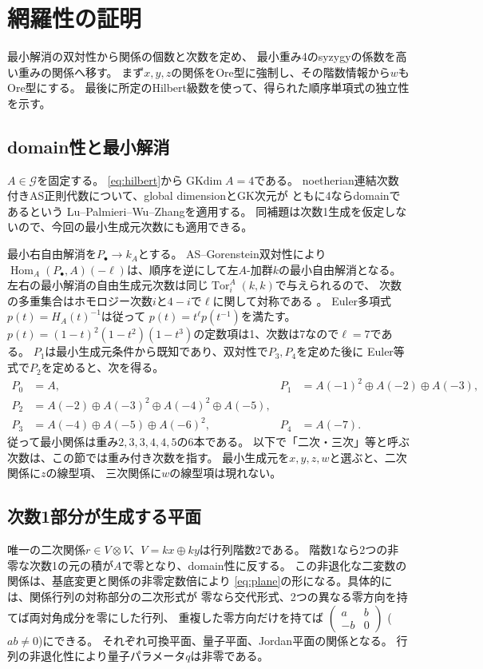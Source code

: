 \documentclass[11pt,a4paper]{ltjsarticle}
\theoremstyle{definition}
\newcommand{\Tor}{\operatorname{Tor}}
\newcommand{\Hom}{\operatorname{Hom}}
\newcommand{\GKdim}{\operatorname{GKdim}}
\newcommand{\Gclass}{\mathcal G}
\begin{document}
\section{網羅性の証明}\label{sec:exhaustion}
最小解消の双対性から関係の個数と次数を定め、
最小重み4のsyzygyの係数を高い重みの関係へ移す。
まず$x,y,z$の関係をOre型に強制し、その階数情報から$w$もOre型にする。
最後に所定のHilbert級数を使って、得られた順序単項式の独立性を示す。

\subsection{domain性と最小解消}
$A\in\Gclass$を固定する。
\eqref{eq:hilbert}から$\GKdim A=4$である。
noetherian連結次数付きAS正則代数について、global dimensionとGK次元が
ともに4ならdomainであるという
Lu--Palmieri--Wu--Zhang\cite[Lemma~1.3]{LPWZ}を適用する。
同補題は次数1生成を仮定しないので、今回の最小生成元次数にも適用できる。

最小右自由解消を$P_\bullet\to k_A$とする。
AS--Gorenstein双対性により
$\Hom_A(P_\bullet,A)(-\ell)$は、順序を逆にして左$A$-加群$k$の最小自由解消となる。
左右の最小解消の自由生成元次数は同じ$\Tor^A_i(k,k)$で与えられるので、
次数の多重集合はホモロジー次数$i$と$4-i$で$\ell$に関して対称である
\cite[Lemma~1.1]{LPWZ}。
Euler多項式$p(t)=H_A(t)^{-1}$は従って
$p(t)=t^\ell p(t^{-1})$を満たす。
$p(t)=(1-t)^2(1-t^2)(1-t^3)$の定数項は1、次数は7なので$\ell=7$である。
$P_1$は最小生成元条件から既知であり、双対性で$P_3,P_4$を定めた後に
Euler等式で$P_2$を定めると、次を得る。
\begin{equation}\label{eq:resolution}
\begin{aligned}
P_0&=A,& P_1&=A(-1)^2\oplus A(-2)\oplus A(-3),\\
P_2&=A(-2)\oplus A(-3)^2\oplus A(-4)^2\oplus A(-5),\\
P_3&=A(-4)\oplus A(-5)\oplus A(-6)^2,& P_4&=A(-7).
\end{aligned}
\end{equation}
従って最小関係は重み$2,3,3,4,4,5$の6本である。
以下で「二次・三次」等と呼ぶ次数は、この節では重み付き次数を指す。
最小生成元を$x,y,z,w$と選ぶと、二次関係に$z$の線型項、
三次関係に$w$の線型項は現れない。

\subsection{次数1部分が生成する平面}
唯一の二次関係$r\in V\otimes V$、$V=kx\oplus ky$は行列階数2である。
階数1なら2つの非零な次数1の元の積が$A$で零となり、domain性に反する。
この非退化な二変数の関係は、基底変更と関係の非零定数倍により
\eqref{eq:plane}の形になる。具体的には、関係行列の対称部分の二次形式が
零なら交代形式、2つの異なる零方向を持てば両対角成分を零にした行列、
重複した零方向だけを持てば
$\left(\begin{smallmatrix}a&b\\-b&0\end{smallmatrix}\right)$
($ab\ne0$)にできる。
それぞれ可換平面、量子平面、Jordan平面の関係となる。
行列の非退化性により量子パラメータ$q$は非零である。
\end{document}
